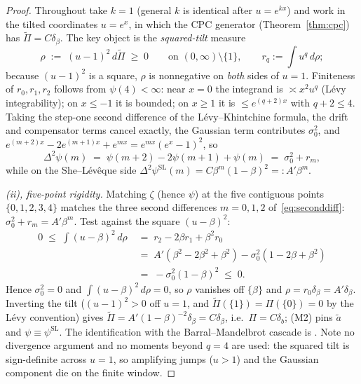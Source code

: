 \documentclass[pdflatex,sn-mathphys-num]{sn-jnl}
\theoremstyle{thmstyleone}
\theoremstyle{thmstyletwo}
\theoremstyle{thmstylethree}
\begin{document}
\begin{proof}
Throughout take $k = 1$ (general $k$ is identical after $u =
e^{kx}$) and work in the tilted coordinates $u = e^{x}$, in which
the CPC generator (Theorem~\ref{thm:cpc}) has $\tilde\Pi = C
\delta_\beta$.  The key object is the \emph{squared-tilt} measure
\[
  \rho \;:=\; (u-1)^2\,d\tilde\Pi \;\ge\; 0
  \qquad\text{on } (0,\infty)\setminus\{1\},
  \qquad r_q := \int u^q\,d\rho ;
\]
because $(u-1)^2$ is a square, $\rho$ is nonnegative on \emph{both}
sides of $u = 1$.  Finiteness of $r_0, r_1, r_2$ follows from
$\psi(4) < \infty$: near $x = 0$ the integrand is $\asymp x^2 u^q$
(L\'evy integrability); on $x \le -1$ it is bounded; on $x \ge 1$
it is $\le e^{(q+2)x}$ with $q + 2 \le 4$.  Taking the step-one
second difference of the L\'evy--Khintchine formula, the drift and
compensator terms cancel exactly, the Gaussian term contributes
$\sigma_0^2$, and $e^{(m+2)x} - 2e^{(m+1)x} + e^{mx} =
e^{mx}(e^{x}-1)^2$, so
\begin{equation}\label{eq:seconddiff}
  \Delta^2\psi(m) \;=\; \psi(m+2) - 2\psi(m+1) + \psi(m)
  \;=\; \sigma_0^2 + r_m ,
\end{equation}
while on the She--L\'ev\^eque side $\Delta^2\psi^{\mathrm{SL}}(m) =
C\beta^m(1-\beta)^2 =: A'\beta^m$.

\smallskip
\textit{(ii), five-point rigidity.}  Matching $\zeta$ (hence
$\psi$) at the five contiguous points $\{0,1,2,3,4\}$ matches the
three second differences $m = 0, 1, 2$ of~\eqref{eq:seconddiff}:
$\sigma_0^2 + r_m = A'\beta^m$.  Test against the square
$(u-\beta)^2$:
\[
\begin{aligned}
  0 \;\le\; \int (u-\beta)^2\,d\rho
  &\;=\; r_2 - 2\beta r_1 + \beta^2 r_0 \\
  &\;=\; A'(\beta^2 - 2\beta^2 + \beta^2)
        - \sigma_0^2(1 - 2\beta + \beta^2) \\
  &\;=\; -\sigma_0^2(1-\beta)^2 \;\le\; 0 .
\end{aligned}
\]
Hence $\sigma_0^2 = 0$ and $\int(u-\beta)^2\,d\rho = 0$, so $\rho$
vanishes off $\{\beta\}$ and $\rho = r_0\delta_\beta =
A'\delta_\beta$.  Inverting the tilt ($(u-1)^2 > 0$ off $u = 1$,
and $\tilde\Pi(\{1\}) = \Pi(\{0\}) = 0$ by the L\'evy convention)
gives $\tilde\Pi = A'(1-\beta)^{-2}\delta_\beta = C\delta_\beta$,
i.e.\ $\Pi = C\delta_b$; (M2) pins $\tilde a$ and $\psi \equiv
\psi^{\mathrm{SL}}$.  The identification with the
Barral--Mandelbrot cascade is \cite{BM03}.  Note no divergence
argument and no moments beyond $q = 4$ are used: the squared tilt
is sign-definite across $u = 1$, so amplifying jumps ($u > 1$) and
the Gaussian component die on the finite window.


\end{proof}
\end{document}
